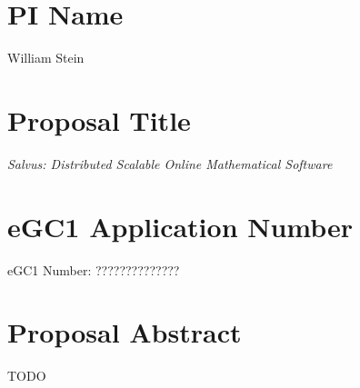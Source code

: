 \documentclass[11pt]{article}
\begin{document}
\mbox{}\vspace{4ex}

\section*{PI Name} 
William Stein

\vspace{3ex}
\section*{Proposal Title} 
{\em Salvus: Distributed Scalable Online Mathematical Software}

\vspace{3ex}

\section*{eGC1 Application Number} 
eGC1 Number: ??????????????

\vspace{3ex}

\section*{Proposal Abstract} 
TODO

\vspace{3ex}
\end{document}
